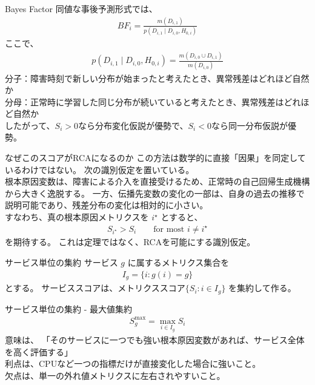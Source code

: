 \documentclass[dvipdfmx, 11pt, aspectratio=169, notheorems]{beamer}
\begin{document}
\begin{frame}{Bayes Factor}
    同値な事後予測形式では、
    \begin{align}
        BF_i = \frac{m(D_{i,1})}{p(D_{i,1}\mid D_{i,0},H_{0,i})}
    \end{align}
    ここで、
    \begin{align}
        p(D_{i,1}\mid D_{i,0},H_{0,i}) = \frac{ m(D_{i,0}\cup D_{i,1})}{m(D_{i,0})}
    \end{align}
    分子：障害時刻で新しい分布が始まったと考えたとき、異常残差はどれほど自然か \\
    分母：正常時に学習した同じ分布が続いていると考えたとき、異常残差はどれほど自然か \\
    したがって、$S_i>0$なら分布変化仮説が優勢で、$S_i<0$なら同一分布仮説が優勢。
\end{frame}

\begin{frame}{なぜこのスコアがRCAになるのか}
    この方法は数学的に直接「因果」を同定しているわけではない。
    次の識別仮定を置いている。\\
    \vspace{12pt}
    根本原因変数は、障害による介入を直接受けるため、正常時の自己回帰生成機構から大きく逸脱する。
    一方、伝播先変数の変化の一部は、自身の過去の推移で説明可能であり、残差分布の変化は相対的に小さい。\\
    \vspace{12pt}
    すなわち、真の根本原因メトリクスを \(i^\star\) とすると、
    \begin{align}
    S_{i^\star} > S_i \qquad \text{for most }i\neq i^\star
    \end{align}を期待する。
    これは定理ではなく、RCAを可能にする識別仮定。
\end{frame}

\begin{frame}{サービス単位の集約}
    サービス $g$ に属するメトリクス集合を
    \begin{align}
        I_g = \{i:g(i)=g\}
    \end{align}とする。
    サービススコアは、メトリクススコア$\{S_i:i\in I_g\}$
    を集約して作る。
\end{frame}

\begin{frame}{サービス単位の集約 - 最大値集約}
    \begin{align}
        S_g^{\max} = \max_{i\in I_g}S_i
    \end{align}意味は、
    「そのサービスに一つでも強い根本原因変数があれば、サービス全体を高く評価する」\\
    利点は、CPUなど一つの指標だけが直接変化した場合に強いこと。\\
    欠点は、単一の外れ値メトリクスに左右されやすいこと。
\end{frame}
\end{document}
